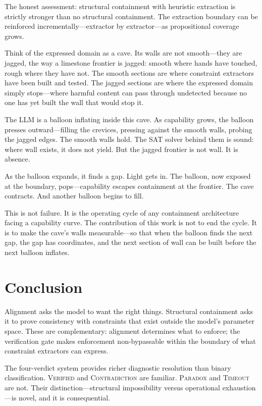 \documentclass[11pt,a4paper]{article}
\begin{document}
The honest assessment: structural containment with heuristic extraction is strictly stronger than no structural containment.
The extraction boundary can be reinforced incrementally---extractor by extractor---as propositional coverage grows.

Think of the expressed domain as a cave.
Its walls are not smooth---they are jagged, the way a limestone frontier is jagged: smooth where hands have touched, rough where they have not.
The smooth sections are where constraint extractors have been built and tested.
The jagged sections are where the expressed domain simply stops---where harmful content can pass through undetected because no one has yet built the wall that would stop it.

The LLM is a balloon inflating inside this cave.
As capability grows, the balloon presses outward---filling the crevices, pressing against the smooth walls, probing the jagged edges.
The smooth walls hold.
The SAT solver behind them is sound: where wall exists, it does not yield.
But the jagged frontier is not wall.
It is absence.

As the balloon expands, it finds a gap.
Light gets in.
The balloon, now exposed at the boundary, pops---capability escapes containment at the frontier.
The cave contracts.
And another balloon begins to fill.

This is not failure.
It is the operating cycle of any containment architecture facing a capability curve.
The contribution of this work is not to end the cycle.
It is to make the cave's walls measurable---so that when the balloon finds the next gap, the gap has coordinates, and the next section of wall can be built before the next balloon inflates.

\section{Conclusion}

Alignment asks the model to want the right things.
Structural containment asks it to prove consistency with constraints that exist outside the model's parameter space.
These are complementary: alignment determines what to enforce; the verification gate makes enforcement non-bypassable within the boundary of what constraint extractors can express.

The four-verdict system provides richer diagnostic resolution than binary classification.
\textsc{Verified} and \textsc{Contradiction} are familiar.
\textsc{Paradox} and \textsc{Timeout} are not.
Their distinction---structural impossibility versus operational exhaustion---is novel, and it is consequential.
\end{document}
